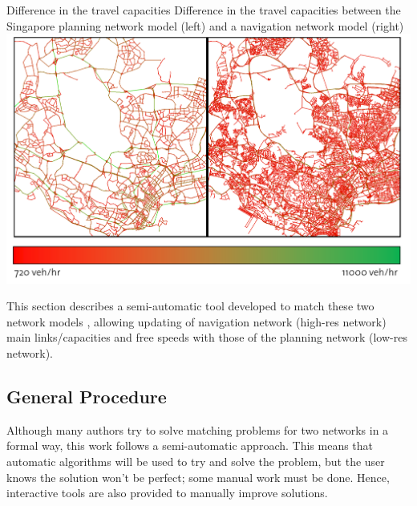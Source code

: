 \createfigure
{Difference in the travel capacities}
{Difference in the travel capacities between the Singapore planning network model (left) and a navigation network model (right)}
{\label{fig:Capacities}}
{\includegraphics[width=1.0\textwidth]{extending/figures/netEdSing/Capacities.png}}
{}

This section describes a semi-automatic tool developed to match these two network models \citep[][]{Ordonez_Webpage_2011_3}, allowing updating of navigation network (high-res network) main links/capacities and free speeds with those of the planning network (low-res network).

\subsection{General Procedure}
Although many authors try to solve matching problems for two networks in a formal way, this work follows a semi-automatic approach. This means that automatic algorithms will be used to try and solve the problem, but the user knows the solution won't be perfect;  some manual work must be done. Hence, interactive tools are also provided to manually improve solutions.

